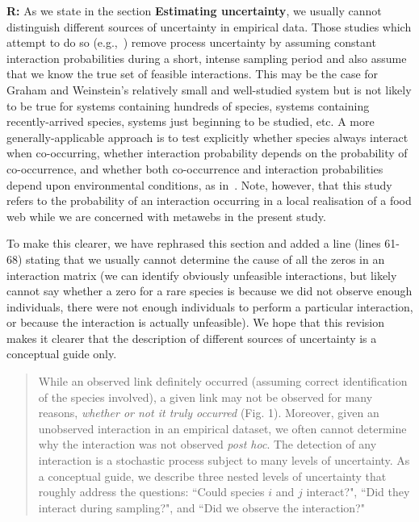 \documentclass[12pt]{letter}
\begin{document}
		\textbf{R:} As we state in the section \textbf{Estimating uncertainty}, we usually cannot distinguish different sources of uncertainty in empirical data. Those studies which attempt to do so (e.g.,~\citet{Graham2018}) remove process uncertainty by assuming constant interaction probabilities during a short, intense sampling period and also assume that we know the true set of feasible interactions. This may be the case for Graham and Weinstein's relatively small and well-studied system but is not likely to be true for systems containing hundreds of species, systems containing recently-arrived species, systems just beginning to be studied, etc. A more generally-applicable approach is to test explicitly whether species always interact when co-occurring, whether interaction probability depends on the probability of co-occurrence, and whether both co-occurrence and interaction probabilities depend upon environmental conditions, as in~\citet{Gravel2018}. Note, however, that this study refers to the probability of an interaction occurring in a local realisation of a food web while we are concerned with metawebs in the present study.
		

		To make this clearer, we have rephrased this section and added a line (lines 61-68) stating that we usually cannot determine the cause of all the zeros in an interaction matrix (we can identify obviously unfeasible interactions, but likely cannot say whether a zero for a rare species is because we did not observe enough individuals, there were not enough individuals to perform a particular interaction, or because the interaction is actually unfeasible). We hope that this revision makes it clearer that the description of different sources of uncertainty is a conceptual guide only.


		\begin{quotation}
			While an observed link definitely occurred (assuming correct identification of the species involved), a given link may not be observed for many reasons, \emph{whether or not it truly occurred} (Fig. 1). Moreover, given an unobserved interaction in an empirical dataset, we often cannot determine why the interaction was not observed \emph{post hoc}. The detection of any interaction is a stochastic process subject to many levels of uncertainty. As a conceptual guide, we describe three nested levels of uncertainty that roughly address the questions: ``Could species $i$ and $j$ interact?", ``Did they interact during sampling?", and ``Did we observe the interaction?"
		\end{quotation}
\end{document}
